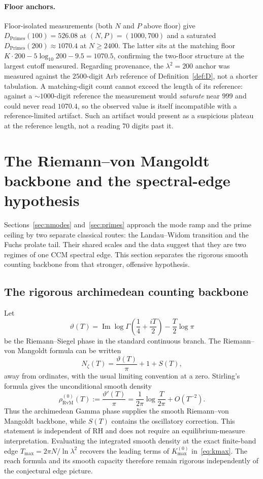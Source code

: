 \documentclass[11pt,a4paper]{article}
\begin{document}
\paragraph{Floor anchors.}
Floor-isolated measurements (both $N$ and $P$ above floor) give
$D_{\mathrm{Primes}}(100)=526.08$ at $(N,P)=(1000,700)$ and a saturated
$D_{\mathrm{Primes}}(200)\approx1070.4$ at $N\ge2400$. The latter sits at the
matching floor $K\cdot200-5\log_{10}200-9.5=1070.5$, confirming the two-floor
structure at the largest cutoff measured. Regarding provenance, the $\lambda^2=200$
anchor was measured against the $2500$-digit Arb reference of
Definition~\ref{def:D}, not a shorter tabulation. A matching-digit count cannot exceed
the length of its reference: against a $\sim1000$-digit reference the
measurement would \emph{saturate} near $999$ and could never read
$1070.4$, so the observed value is itself incompatible with a
reference-limited artifact. Such an artifact would present as a suspicious
plateau at the reference length, not a reading $70$ digits past it.

\section{The Riemann--von Mangoldt backbone and the spectral-edge
hypothesis}\label{sec:equilibrium}

Sections~\ref{sec:nmodes} and~\ref{sec:primes} approach the mode ramp and the
prime ceiling by two separate classical routes: the Landau--Widom transition
and the Fuchs prolate tail. Their shared scales and the data suggest that they
are two regimes of one CCM spectral edge. This section separates the rigorous
smooth counting backbone from that stronger, offensive hypothesis.

\subsection{The rigorous archimedean counting backbone}\label{ssec:eqmeasure}

Let
\[
 \vartheta(T)=
 \operatorname{Im}\log\Gamma\!\left(\frac14+\frac{iT}{2}\right)
 -\frac{T}{2}\log\pi
\]
be the Riemann--Siegel phase in the standard continuous branch. The
Riemann--von Mangoldt formula can be written
\[
 N_\zeta(T)=\frac{\vartheta(T)}{\pi}+1+S(T),
\]
away from ordinates, with the usual limiting convention at a zero. Stirling's
formula gives the unconditional smooth density
\begin{equation}\label{eq:rvm}
 \rho_{\mathrm{RvM}}^{(0)}(T)
 :=\frac{\vartheta'(T)}{\pi}
 =\frac{1}{2\pi}\log\frac{T}{2\pi}+O(T^{-2}).
\end{equation}
Thus the archimedean Gamma phase supplies the smooth Riemann--von Mangoldt
backbone, while $S(T)$ contains the oscillatory correction. This statement is
independent of RH and does not require an equilibrium-measure interpretation.
Evaluating the integrated smooth density at the exact finite-band edge
$T_{\max}=2\pi N/\ln\lambda^2$ recovers the leading terms of
$K_{\max}^{(0)}$ in~\eqref{eq:kmax}. The reach formula and its smooth capacity
therefore remain rigorous independently of the conjectural edge picture.
\end{document}
